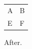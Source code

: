 \documentclass{article}
\begin{document}
\begin{tabularx}{\linewidth}{XX}
A \verb|ab & B \\
E & F \\
\end{tabularx}
After.
\end{document}
